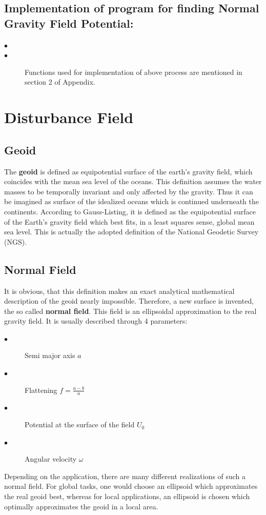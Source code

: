 \documentclass[a4paper,12pt]{report}
\begin{document}
\section{Implementation of program for finding Normal Gravity Field Potential:}
\begin{description}
\item[$\bullet$]
\item[$\bullet$]Functions used for implementation of above process are mentioned in section 2 of Appendix.
\end{description}   

\newpage
\chapter{Disturbance Field}
\section{Geoid}
The \textbf{geoid} is defined as equipotential surface of the earth’s gravity field, which coincides with the mean sea level of the oceans. This definition assumes the water masses to be temporally invariant and only affected by the gravity. Thus it can be imagined as surface of the idealized oceans which is continued underneath the continents. According to Gauss-Listing, it is defined as the equipotential surface of the Earth’s gravity field which best fits, in a least squares sense, global mean sea level. This is actually the adopted definition of the National Geodetic Survey (NGS).\\

\section{Normal Field}
It is obvious, that this definition makes an exact analytical mathematical description of the geoid nearly impossible. Therefore, a new surface is invented, the so called \textbf{normal field}. This field is an ellipsoidal approximation to the real gravity field. It is usually described through 4 parameters:
\begin{description}
\item[$\bullet$]Semi major axis $a$
\item[$\bullet$]Flattening $f=\frac{a-b}{a}$
\item[$\bullet$]Potential at the surface of the field $U_0$
\item[$\bullet$]Angular velocity $\omega$
\end{description}
Depending on the application, there are many different realizations of such a normal field. For global tasks, one would choose an ellipsoid which approximates the real geoid
best, whereas for local applications, an ellipsoid is chosen which optimally approximates the geoid in a local area.\\
\end{document}
